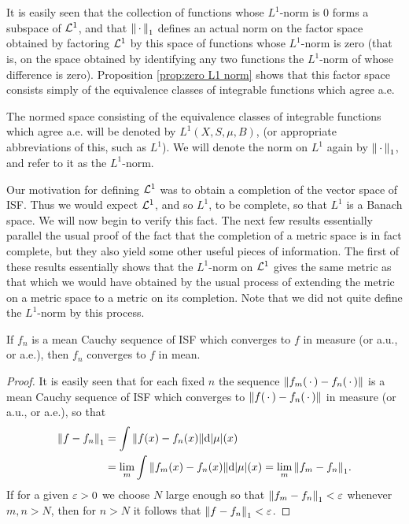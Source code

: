 It is easily seen that the collection of functions whose $L^1$-norm is $0$ forms a subspace of ${\cal L}^1$, and that $\norm{\,\cdot\,}_1$ defines an actual norm on the factor space obtained by factoring ${\cal L}^1$ by this space of functions whose $L^1$-norm is zero (that is, on the space obtained by identifying any two functions the $L^1$-norm of whose difference is zero). Proposition \ref{prop:zero L1 norm} shows that this factor space consists simply of the equivalence classes of integrable functions which agree a.e.

\begin{definition}
The normed space consisting of the equivalence classes of integrable functions which agree a.e. will be denoted by $L^1(X,S,\mu,B)$, (or appropriate abbreviations of this, such as $L^1$). We will denote the norm on $L^1$ again by $\norm{\,\cdot\,}_1$, and refer to it as the $L^1$-norm.
\end{definition}

Our motivation for defining ${\cal L}^1$ was to obtain a completion of the vector space of ISF. Thus we would expect ${\cal L}^1$, and so $L^1$, to be complete, so that $L^1$ is a Banach space. We will now begin to verify this fact. The next few results essentially parallel the usual proof of the fact that the completion of a metric space is in fact complete, but they also yield some other useful pieces of information. The first of these results essentially shows that the $L^1$-norm on ${\cal L}^1$ gives the same metric as that which we would have obtained by the usual process of extending the metric on a metric space to a metric on its completion. Note that we did not quite define the $L^1$-norm by this process.

\begin{lemma}
\label{lem:ISF converge in measure implies mean}
If $f_n$ is a mean Cauchy sequence of ISF which converges to $f$ in measure (or a.u., or a.e.), then $f_n$ converges to $f$ in mean.
\end{lemma}

\begin{proof}
It is easily seen that for each fixed $n$ the sequence $\norm{f_m(\,\cdot\,)-f_n(\,\cdot\,)}$ is a mean Cauchy sequence of ISF which converges to $\norm{f(\,\cdot\,)-f_n(\,\cdot\,)}$ in measure (or a.u., or a.e.), so that
\begin{align*}
    \norm{f-f_n}_1&=\int\norm{f(x)-f_n(x)}\dd|\mu|(x)\\
    &=\lim_m\int\norm{f_m(x)-f_n(x)}\dd|\mu|(x)=\lim_m\norm{f_m-f_n}_1.
\end{align*}
If for a given $\varepsilon>0$ we choose $N$ large enough so that $\norm{f_m-f_n}_1<\varepsilon$ whenever $m,n>N$, then for $n>N$ it follows that $\norm{f-f_n}_1<\varepsilon$.
\end{proof}

